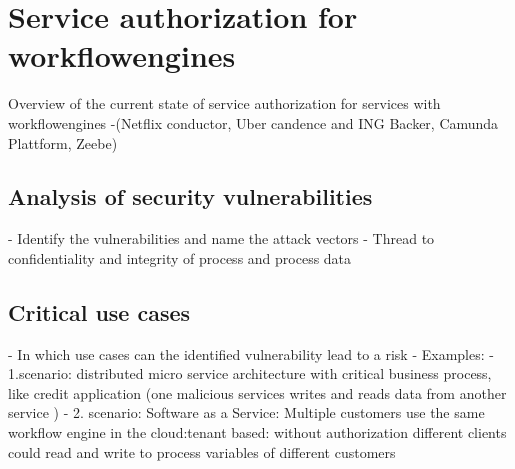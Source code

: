 \section{Service authorization for workflowengines}\label{serviceAuthorizationForWorkflowengines}

Overview of the current state of service authorization for services with workflowengines
-(Netflix conductor, Uber candence and ING Backer, Camunda Plattform, Zeebe)

\subsection{Analysis of security vulnerabilities}\label{analysisVulnerabilities}
- Identify the vulnerabilities and name the attack vectors
- Thread to confidentiality and integrity of process and process data

\subsection{Critical use cases}\label{criticalUseCases}
- In which use cases can the identified vulnerability lead to a risk
- Examples:
- 1.scenario: distributed micro service architecture with critical business process, like credit application
(one malicious services writes and reads data from another service )
- 2. scenario: Software as a Service: Multiple customers use the same workflow engine in the
cloud:tenant based: without authorization different clients could read and write to process variables
of different customers